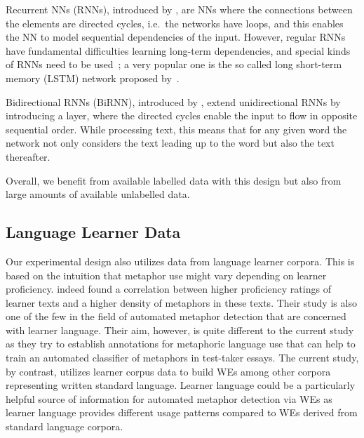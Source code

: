\documentclass[11pt,a4paper]{article}
\begin{document}
Recurrent NNs (RNNs), introduced by , are NNs where the connections between the elements are directed cycles, i.e.~the networks have loops, and this enables the NN to model sequential dependencies of the input.
However, regular RNNs have fundamental difficulties learning long-term dependencies, and special kinds of RNNs need to be used~\cite{Hochreiter1991}; 
a very popular one is the so called long short-term memory (LSTM) network proposed by~.

Bidirectional RNNs (BiRNN), introduced by , extend unidirectional RNNs by introducing a layer, where the directed cycles enable the input to flow in opposite sequential order. 
While processing text, this means that for any given word the network not only considers the text leading up to the word but also the text thereafter.

Overall, we benefit from available labelled data with this design but
also from large amounts of available unlabelled data.


\subsection{Language Learner Data} %
\label{subsec:lld}

Our experimental design also utilizes data from language learner corpora. 
This is based on the intuition that metaphor use might vary depending on learner proficiency.
indeed found a correlation between higher proficiency ratings of learner texts and a higher density of metaphors in these texts. Their study is also one of the few in the field of automated metaphor detection that are concerned with learner language. Their aim, however, is quite different to the current study as they try to establish annotations for metaphoric language use that can help to train an automated classifier of metaphors in test-taker essays. The current study, by contrast, utilizes learner corpus data to build WEs among other corpora representing written standard language. Learner language could be a particularly helpful source of information for automated metaphor detection via WEs as learner language provides different usage patterns compared to WEs derived from standard language corpora.
\end{document}
